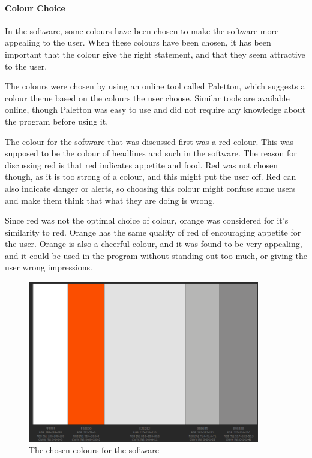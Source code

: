 \paragraph{Colour Choice}

In the software, some colours have been chosen to make the software more appealing to the user. When these colours have been chosen, it has been important that the colour give the right statement, and that they seem attractive to the user.

The colours were chosen by using an online tool called Paletton\cite{paletton}, which suggests a colour theme based on the colours the user choose. Similar tools are available online, though Paletton was easy to use and did not require any knowledge about the program before using it.

The colour for the software that was discussed first was a red colour. This was supposed to be the colour of headlines and such in the software. The reason for discussing red is that red indicates appetite and food\cite{color_psychology}. Red was not chosen though, as it is too strong of a colour, and this might put the user off. Red can also indicate danger or alerts, so choosing this colour might confuse some users and make them think that what they are doing is wrong.

Since red was not the optimal choice of colour, orange was considered for it's similarity to red. Orange has the same quality of red of encouraging appetite for the user. Orange is also a cheerful colour, and it was found to be very appealing, and it could be used in the program without standing out too much, or giving the user wrong impressions.

\begin{figure}[H]
	\centering
    \includegraphics[width=0.9\textwidth]{Grafik/FoodPlanner/ChosenColours}
	\caption{The chosen colours for the software}
	\label{ChosenColours}
\end{figure}


